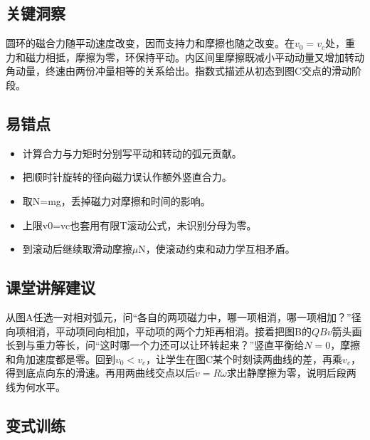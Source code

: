 \documentclass[UTF8,fontset=fandol,a4paper,11pt]{ctexart}
\begin{document}


\subsection*{关键洞察}

圆环的磁合力随平动速度改变，因而支持力和摩擦也随之改变。在$v_0=v_c$处，重力和磁力相抵，摩擦为零，环保持平动。内区间里摩擦既减小平动动量又增加转动角动量，终速由两份冲量相等的关系给出。指数式描述从初态到图C交点的滑动阶段。



\subsection*{易错点}

\begin{itemize}
\item 计算合力与力矩时分别写平动和转动的弧元贡献。
\item 把顺时针旋转的径向磁力误认作额外竖直合力。
\item 取N=mg，丢掉磁力对摩擦和时间的影响。
\item 上限v0=vc也套用有限T滚动公式，未识别分母为零。
\item 到滚动后继续取滑动摩擦$\mu$N，使滚动约束和动力学互相矛盾。
\end{itemize}



\subsection*{课堂讲解建议}

从图A任选一对相对弧元，问“各自的两项磁力中，哪一项相消，哪一项相加？”径向项相消，平动项同向相加，平动项的两个力矩再相消。接着把图B的$QBv$箭头画长到与重力等长，问“这时哪一个力还可以让环转起来？”竖直平衡给$N=0$，摩擦和角加速度都是零。回到$v_0<v_c$，让学生在图C某个时刻读两曲线的差，再乘$v_c$，得到底点向东的滑速。再用两曲线交点以后$\dot v=R\dot\omega$求出静摩擦为零，说明后段两线为何水平。



\subsection*{变式训练}
\end{document}

